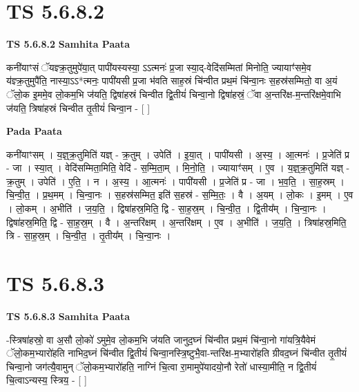 \documentclass[17pt]{extarticle}
\begin{document}
\section*{ TS 5.6.8.2 }

\textbf{TS 5.6.8.2 } \newline
\textbf{Samhita Paata} \newline

कनी॑याꣳसं ॅयज्ञ्क्र॒तुमुपे॑या॒त् पापी॑यस्यस्या॒ ऽऽत्मनः॑ प्र॒जा स्या॒द्-वेदि॑सम्मितां मिनोति॒ ज्यायाꣳ॑समे॒व य॑ज्ञ्क्र॒तुमुपै॑ति॒ नास्या॒ऽऽ*त्मनः॒ पापी॑यसी प्र॒जा भ॑वति साह॒स्रं चि॑न्वीत प्रथ॒मं चि॑न्वा॒नः स॒हस्र॑सम्मितो॒ वा अ॒यं ॅलो॒क इ॒ममे॒व लो॒कम॒भि ज॑यति॒ द्विषा॑हस्रं चिन्वीत द्वि॒तीयं॑ चिन्वा॒नो द्विषा॑हस्रं॒ ॅवा अ॒न्तरि॑क्ष-म॒न्तरि॑क्षमे॒वाभि ज॑यति॒ त्रिषा॑हस्रं चिन्वीत तृ॒तीयं॑ चिन्वा॒न - [  ] \newline

\textbf{Pada Paata} \newline

कनी॑याꣳसम् । य॒ज्ञ्॒क्र॒तुमिति॑ यज्ञ् - क्र॒तुम् । उपेति॑ । इ॒या॒त् । पापी॑यसी । अ॒स्य॒ । आ॒त्मनः॑ । प्र॒जेति॑ प्र - जा । स्या॒त् । वेदि॑सम्मिता॒मिति॒ वेदि॑ - स॒म्मि॒ता॒म् । मि॒नो॒ति॒ । ज्यायाꣳ॑सम् । ए॒व । य॒ज्ञ्॒क्र॒तुमिति॑ यज्ञ् - क्र॒तुम् । उपेति॑ । ए॒ति॒ । न । अ॒स्य॒ । आ॒त्मनः॑ । पापी॑यसी । प्र॒जेति॑ प्र - जा । भ॒व॒ति॒ । सा॒ह॒स्रम् । चि॒न्वी॒त॒ । प्र॒थ॒मम् । चि॒न्वा॒नः । स॒हस्र॑सम्मित॒ इति॑ स॒हस्र॑ - स॒म्मि॒तः॒ । वै । अ॒यम् । लो॒कः ।   इ॒मम् । ए॒व । लो॒कम् । अ॒भीति॑ । ज॒य॒ति॒ । द्विषा॑हस्र॒मिति॒ द्वि - सा॒ह॒स्र॒म् । चि॒न्वी॒त॒ । द्वि॒तीय᳚म् । चि॒न्वा॒नः । द्विषा॑हस्र॒मिति॒ द्वि - सा॒ह॒स्र॒म् । वै । अ॒न्तरि॑क्षम् । अ॒न्तरि॑क्षम् । ए॒व । अ॒भीति॑ । ज॒य॒ति॒ । त्रिषा॑हस्र॒मिति॒ त्रि - सा॒ह॒स्र॒म् । चि॒न्वी॒त॒ । तृ॒तीय᳚म् । चि॒न्वा॒नः ।  \newline




\section*{ TS 5.6.8.3 }

\textbf{TS 5.6.8.3 } \newline
\textbf{Samhita Paata} \newline

-स्त्रिषा॑हस्रो॒ वा अ॒सौ लो॒को॑ ऽमुमे॒व लो॒कम॒भि ज॑यति जानुद॒घ्नं चि॑न्वीत प्रथ॒मं चि॑न्वा॒नो गा॑यत्रि॒यैवेमं ॅलो॒कम॒भ्यारो॑हति नाभिद॒घ्नं चि॑न्वीत द्वि॒तीयं॑ चिन्वा॒नस्त्रि॒ष्टुभै॒वा-न्तरि॑क्ष-म॒भ्यारो॑हति ग्रीवद॒घ्नं चि॑न्वीत तृ॒तीयं॑ चिन्वा॒नो जग॑त्यै॒वामुन् ॅलो॒कम॒भ्यारो॑हति॒ नाग्निं चि॒त्वा रा॒मामुपे॑यादयो॒नौ रेतो॑ धास्या॒मीति॒ न द्वि॒तीयं॑ चि॒त्वाऽन्यस्य॒ स्त्रिय॒ - [  ] \newline
\end{document}
